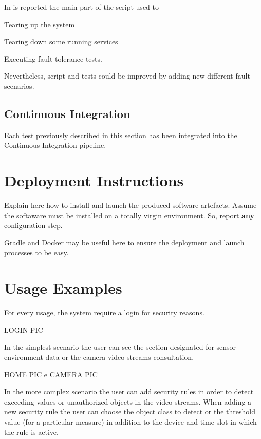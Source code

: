 \documentclass{scrartcl}
\begin{document}
    In  is reported the main part of the script used to
    \begin{enumerate*}
        \item Tearing up the system
        \item Tearing down some running services
        \item Executing fault tolerance tests.
    \end{enumerate*}

    Nevertheless, script and tests could be improved by adding new different fault scenarios.

    

    \subsection{Continuous Integration}\label{subsec:continuous-integration}

    Each test previously described in this section has been integrated into the Continuous Integration pipeline.


    \section{Deployment Instructions}

    Explain here how to install and launch the produced software artefacts.
%
    Assume the softaware must be installed on a totally virgin environment.
%
    So, report \textbf{any} configuration step.

    Gradle and Docker may be useful here to ensure the deployment and launch processes to be easy.


    \section{Usage Examples}

    For every usage, the system require a login for security reasons.

    LOGIN PIC

    In the simplest scenario the user can see the section designated for sensor environment data or the camera video streams consultation.

    HOME PIC e CAMERA PIC

    In the more complex scenario the user can add security rules in order to detect exceeding values or unauthorized objects in the video streams.
    When adding a new security rule the user can choose the object class to detect or the threshold value (for a particular measure) in addition to the device and time slot in which the rule is active.
\end{document}
